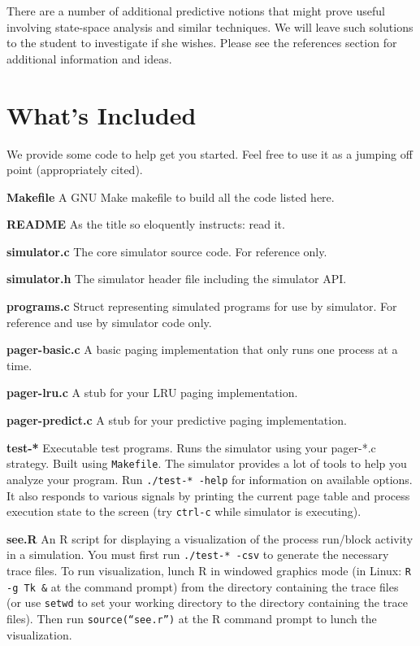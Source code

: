 \documentclass[12pt]{article}
\newenvironment{packed_enum}{
\begin{enumerate}
  \setlength{\itemsep}{1pt}
  \setlength{\parskip}{0pt}
  \setlength{\parsep}{0pt}
}{\end{enumerate}}
\begin{document}
There are a number of additional predictive notions that might prove
useful involving state-space analysis and similar techniques. We
will leave such solutions to the student to investigate if she
wishes. Please see the references section for additional information
and ideas.

\section{What's Included}

We provide some code to help get you started. Feel free to use it as a
jumping off point (appropriately cited).

\begin{packed_enum}
\item {\bf Makefile} A GNU Make makefile to build all the code listed
  here.
\item {\bf README} As the title so eloquently instructs: read it.
\item {\bf simulator.c} The core simulator source code. For reference
  only.
\item {\bf simulator.h} The simulator header file including the simulator
  API.
\item {\bf programs.c} Struct representing simulated programs for use
  by simulator. For reference and use by simulator code only.
\item {\bf pager-basic.c} A basic paging implementation that only runs
  one process at a time.
\item {\bf pager-lru.c} A stub for your LRU paging implementation.
\item {\bf pager-predict.c} A stub for your predictive paging implementation.
\item {\bf test-*} Executable test programs. Runs the simulator using
  your pager-*.c strategy. Built using \texttt{Makefile}. The simulator
  provides a lot of tools to help you analyze your program.
  Run \texttt{./test-* -help} for information on available options. It
  also responds to various signals by printing the current page table
  and process execution state to the screen (try \texttt{ctrl-c} while
  simulator is executing).
\item {\bf see.R} An R script for displaying a visualization of the
  process run/block activity in a simulation.
  You must first run \texttt{./test-* -csv} to
  generate the necessary trace files. To run visualization, lunch R in
  windowed graphics mode (in Linux: \texttt{R -g Tk \&} at the command
  prompt) from the directory containing the trace
  files (or use \texttt{setwd} to set your working directory to the directory
  containing the trace files). Then run \texttt{source(``see.r'')} at the R
  command prompt to lunch the visualization.
\end{packed_enum}
\end{document}
